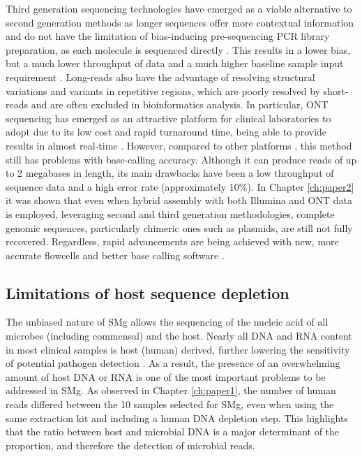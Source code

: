 Third generation sequencing technologies have emerged as a viable alternative to second generation methods as longer sequences offer more contextual information and do not have the limitation of bias-inducing pre-sequencing \ac{PCR} library preparation, as each molecule is sequenced directly \citep{loman_twenty_2015, ari_next-generation_2016}. This results in a lower bias, but a much lower throughput of data and a much higher baseline sample input requirement \citep{gu_clinical_2019}. Long-reads also have the advantage of resolving structural variations and variants in repetitive regions, which are poorly resolved by short-reads and are often excluded in bioinformatics analysis. In particular, \ac{ONT} sequencing has emerged as an attractive platform for clinical laboratories to adopt due to its low cost and rapid turnaround time, being able to provide results in almost real-time \citep{petersen_third-generation_2019}. However, compared to other platforms \citep{gu_clinical_2019}, this method still has problems with base-calling accuracy. Although it can produce reads of up to 2 megabases in length, its main drawbacks have been a low throughput of sequence data and a high error rate (approximately 10\%). In Chapter \ref{ch:paper2} it was shown that even when hybrid assembly with both Illumina and \ac{ONT} data is employed, leveraging second and third generation methodologies, complete genomic sequences, particularly chimeric ones such as plasmids, are still not fully recovered. Regardless, rapid advancements are being achieved with new, more accurate flowcells and better base calling software \citep{sereika_oxford_2021}. 

\subsection{Limitations of host sequence depletion}

The unbiased nature of \ac{SMg} allows the sequencing of the nucleic acid of all microbes (including commensal) and the host. Nearly all \ac{DNA} and \ac{RNA} content in most clinical samples is host (human) derived, further lowering the sensitivity of potential pathogen detection \citep{gu_clinical_2019}. As a result, the presence of an overwhelming amount of host \ac{DNA} or \ac{RNA} is one of the most important problems to be addressed in \ac{SMg}.
As observed in Chapter \ref{ch:paper1}, the number of human reads differed between the 10 samples selected for \ac{SMg}, even when using the same extraction kit and including a human DNA depletion step. This highlights that the ratio between host and microbial DNA is a major determinant of the proportion, and therefore the detection of microbial reads.

